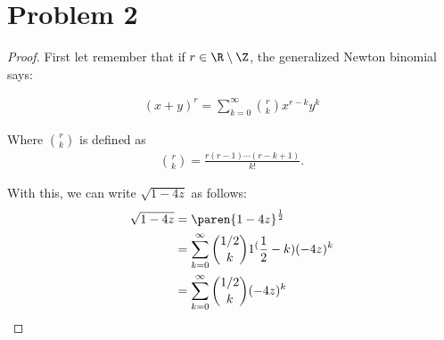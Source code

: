 ﻿\chapter{Problem 2}

\begin{proof}
    First let remember that if $r \in \R \setminus \Z$, the generalized Newton binomial says:
    
    \begin{align}
            (x + y)^r = \sum_{k = 0}^{\infty} \binom{r}{k} x^{r-k} y^{k}
    \end{align}\pn
    
    Where $\binom{r}{k}$ is defined as
    \begin{align}
            \binom{r}{k} = \frac{r(r-1)\cdots(r-k+1)}{k!}.
    \end{align}\pn
    
    With this, we can write $\sqrt{1 - 4z}$ as follows:
    \begin{align}
            \sqrt{1 - 4z}   &=  \paren{1 - 4z}^{\frac{1}{2}}                                        \\
                            &=  \sum_{k = 0}^{\infty} \binom{1/2}{k} 1^(\frac{1}{2}-k)(-4z)^{k}     \\
                            &=  \sum_{k = 0}^{\infty} \binom{1/2}{k} (-4z)^{k}                      \\
    \end{align}
\end{proof}